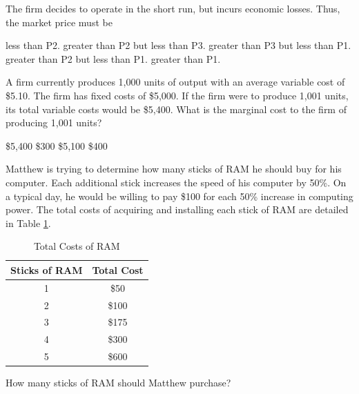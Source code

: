 \documentclass[addpoints,11pt]{exam}
\theoremstyle{definition}
\begin{document}
\begin{questions}
\newpage
	
	The firm decides to operate in the short run, but incurs economic losses. Thus, the market price must be 

	\begin{choices}
		\choice less than P2.
		\choice greater than P2 but less than P3.
		\choice greater than P3 but less than P1.
		\CorrectChoice greater than P2 but less than P1.
		\choice greater than P1.
	\end{choices}

	
\question A firm currently produces 1,000 units of output with an average variable cost of \$5.10. The firm has fixed costs of \$5,000. If the firm were to produce 1,001 units, its total variable costs would be \$5,400. What is the marginal cost to the firm of producing 1,001 units?
		
		
		\begin{choices}
			\choice \$5,400
			\CorrectChoice \$300
			\choice \$5,100
			\choice \$400
		\end{choices}

	
	\question Matthew is trying to determine how many sticks of RAM he should buy for his computer. Each additional stick increases the speed of his computer by 50\%. On a typical day, he would be willing to pay \$100 for each 50\% increase in computing power. The total costs of acquiring and installing each stick of RAM are detailed in Table \ref{MC30}. 
	
	\begin{table}[h!]
		\caption{Total Costs of RAM}
		\centering
		\begin{tabular}{ c| c} 
			
			Sticks of RAM &  Total Cost\\
			\hline
			1 & \$50 \\
			2 & \$100  \\
			3 & \$175 \\
			4 & \$300 \\
			5 & \$600 
		\end{tabular}
		\label{MC30}
	\end{table}
	
	How many sticks of RAM should Matthew purchase?
	
	\begin{choices}
		\choice 1
		\choice 2
		\CorrectChoice 3
		\choice 4
	\end{choices}
	

\end{questions}
\end{document}
